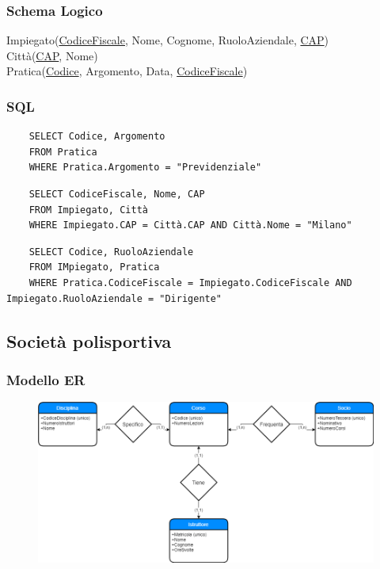 \documentclass{article}
\begin{document}
	\subsubsection{Schema Logico}
	Impiegato(\underline{CodiceFiscale}, Nome, Cognome, RuoloAziendale, \underline{CAP})\\
	Città(\underline{CAP}, Nome)\\
	Pratica(\underline{Codice}, Argomento, Data, \underline{CodiceFiscale})
	\subsubsection{SQL}
	\begin{verbatim}
	SELECT Codice, Argomento
	FROM Pratica
	WHERE Pratica.Argomento = "Previdenziale"
	\end{verbatim}
	\begin{verbatim}
	SELECT CodiceFiscale, Nome, CAP
	FROM Impiegato, Città
	WHERE Impiegato.CAP = Città.CAP AND Città.Nome = "Milano"
	\end{verbatim}
	\begin{verbatim}
	SELECT Codice, RuoloAziendale
	FROM IMpiegato, Pratica
	WHERE Pratica.CodiceFiscale = Impiegato.CodiceFiscale AND Impiegato.RuoloAziendale = "Dirigente"
	\end{verbatim}

	\pagebreak
	
	\subsection{Società polisportiva}
	\subsubsection{Modello ER}
	\begin{figure}[h!]
		\centering
		\includegraphics[scale=0.5]{images/Palestra.png}
	\end{figure}
\end{document}
